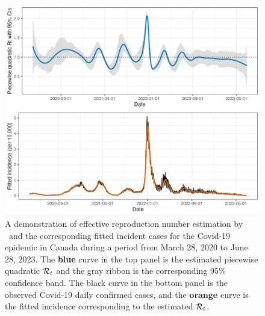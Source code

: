 \begin{figure}[tb]
    \centering
    \includegraphics[width=.9\textwidth]{fig/intro-fig-new.png}
    \caption{A demonstration of effective reproduction number estimation 
    by \RtEstim\ and the corresponding fitted incident cases for the Covid-19 epidemic 
    in Canada during a period from March 28, 2020 to June 28, 2023. 
    The \textcolor{customblue}{\textbf{blue}} curve in the top panel is the estimated piecewise
    quadratic $\mathcal{R}_t$ and the gray ribbon is the corresponding 95\% confidence band. 
    The black curve in the bottom panel is the observed Covid-19 daily confirmed 
    cases, and the \textcolor{customorange}{\textbf{orange}} curve is the fitted incidence 
    corresponding to the estimated $\mathcal{R}_t$.}
    \label{fig:intro-fig}
\end{figure}


